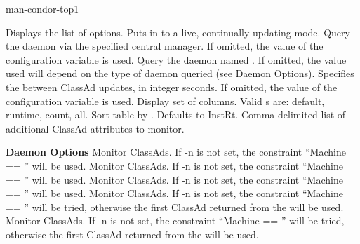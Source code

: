 \begin{ManPage}{}{man-condor-top}{1}
\begin{Options}
            {Displays the list of options.}
            {Puts  in to a live, continually updating mode.}
            {Query the daemon via the specified central manager. If
              omitted, the value of the configuration variable
               is used.}
            {Query the daemon named . If omitted, the value
              used will depend on the type of daemon queried (see
              Daemon Options).}
            {Specifies the  between ClassAd updates, in
              integer seconds. If omitted, the value of the
              configuration variable  is
              used.}
            {Display  set of columns. Valid s are: 
              default, runtime, count, all.}
            {Sort table by . Defaults to InstRt.}
            {Comma-delimited list of additional ClassAd attributes
              to monitor.}

    \textbf{Daemon Options}
            {Monitor  ClassAds. If -n is not set,
              the constraint ``Machine == ''
              will be used.}
            {Monitor  ClassAds. If -n is not set,
              the constraint ``Machine == ''
              will be used.}
            {Monitor  ClassAds. If -n is not set,
              the constraint ``Machine == ''
              will be used.}
            {Monitor  ClassAds. If -n is not set,
              the constraint ``Machine == ''
              will be tried, 
              otherwise the first  ClassAd
              returned from the  will be used.}
            {Monitor  ClassAds. If -n is not set,
              the constraint ``Machine == ''
              will be tried, 
              otherwise the first  ClassAd
              returned from the  will be used.}

\end{Options}

\end{ManPage}
